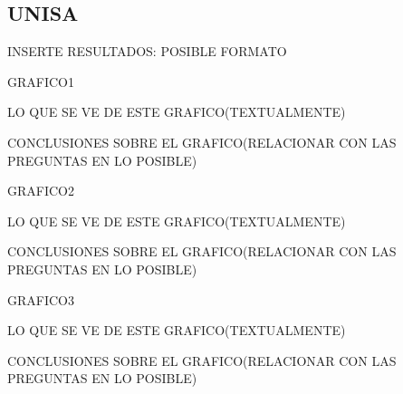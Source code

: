 \subsection{UNISA}

INSERTE RESULTADOS: POSIBLE FORMATO

GRAFICO1

LO QUE SE VE DE ESTE GRAFICO(TEXTUALMENTE)

CONCLUSIONES SOBRE EL GRAFICO(RELACIONAR CON LAS PREGUNTAS EN LO POSIBLE)


GRAFICO2

LO QUE SE VE DE ESTE GRAFICO(TEXTUALMENTE)

CONCLUSIONES SOBRE EL GRAFICO(RELACIONAR CON LAS PREGUNTAS EN LO POSIBLE)


GRAFICO3

LO QUE SE VE DE ESTE GRAFICO(TEXTUALMENTE)

CONCLUSIONES SOBRE EL GRAFICO(RELACIONAR CON LAS PREGUNTAS EN LO POSIBLE)